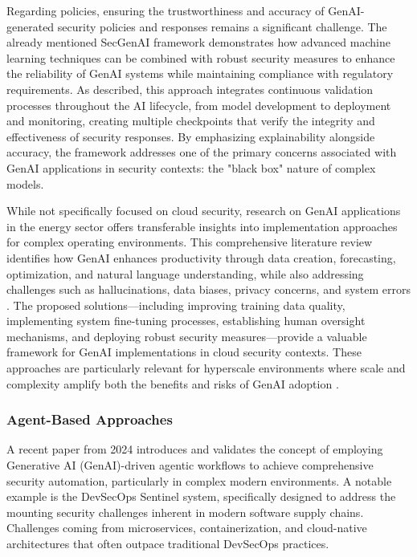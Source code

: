 Regarding policies, ensuring the trustworthiness and accuracy of GenAI-generated security policies and responses remains a significant challenge. The already mentioned SecGenAI framework demonstrates how advanced machine learning techniques can be combined with robust security measures to enhance the reliability of GenAI systems while maintaining compliance with regulatory requirements.\cite{haryanto_secgenai_2024}
As described, this approach integrates continuous validation processes throughout the AI lifecycle, from model development to deployment and monitoring, creating multiple checkpoints that verify the integrity and effectiveness of security responses. By emphasizing explainability alongside accuracy, the framework addresses one of the primary concerns associated with GenAI applications in security contexts: the "black box" nature of complex models.\cite{haryanto_secgenai_2024}

While not specifically focused on cloud security, research on GenAI applications in the energy sector offers transferable insights into implementation approaches for complex operating environments. This comprehensive literature review identifies how GenAI enhances productivity through data creation, forecasting, optimization, and natural language understanding, while also addressing challenges such as hallucinations, data biases, privacy concerns, and system errors \cite{surathunmanun_exploring_2024}.
The proposed solutions—including improving training data quality, implementing system fine-tuning processes, establishing human oversight mechanisms, and deploying robust security measures—provide a valuable framework for GenAI implementations in cloud security contexts. These approaches are particularly relevant for hyperscale environments where scale and complexity amplify both the benefits and risks of GenAI adoption \cite{surathunmanun_exploring_2024}.


\subsubsection{Agent-Based Approaches} %
\label{sec:Agent-Based Approaches}

A recent paper from 2024 introduces and validates the concept of employing Generative AI (GenAI)-driven agentic workflows to achieve comprehensive security automation, particularly in complex modern environments. A notable example is the DevSecOps Sentinel system\cite{noauthor_devsecops_nodate}, specifically designed to address the mounting security challenges inherent in modern software supply chains. Challenges coming from microservices, containerization, and cloud-native architectures that often outpace traditional DevSecOps practices\cite{noauthor_devsecops_nodate}.

